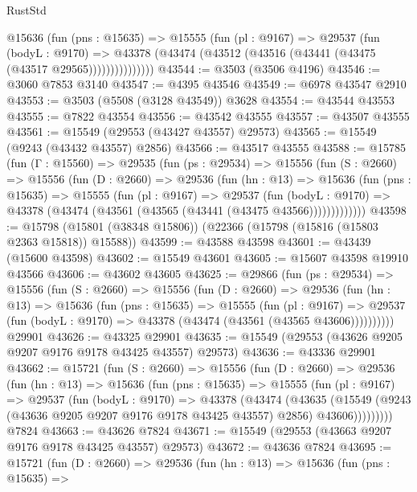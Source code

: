\begin{lexlean}{RustStd}
\begin{coremodule}
              @15636
                (fun (pns : @15635) =>
                @15555
                  (fun (pl : @9167) =>
                  @29537
                    (fun (bodyL : @9170) =>
                    @43378 (@43474 (@43512 (@43516 (@43441 (@43475 (@43517 @29565)))))))))))))))
@43544 := @3503 (@3506 @4196)
@43546 := @3060 @7853 @3140
@43547 := @4395 @43546
@43549 := @6978 @43547 @2910
@43553 := @3503 (@5508 (@3128 @43549)) @3628
@43554 := @43544 @43553
@43555 := @7822 @43554
@43556 := @43542 @43555
@43557 := @43507 @43555
@43561 := @15549 (@29553 (@43427 @43557) @29573)
@43565 := @15549 (@9243 (@43432 @43557) @2856)
@43566 := @43517 @43555
@43588 := @15785
    (fun (Γ : @15560) =>
    @29535
      (fun (ps : @29534) =>
      @15556
        (fun (S : @2660) =>
        @15556
          (fun (D : @2660) =>
          @29536
            (fun (hn : @13) =>
            @15636
              (fun (pns : @15635) =>
              @15555
                (fun (pl : @9167) =>
                @29537
                  (fun (bodyL : @9170) =>
                  @43378 (@43474 (@43561 (@43565 (@43441 (@43475 @43566)))))))))))))
@43598 := @15798 (@15801 (@38348 @15806)) (@22366 (@15798 (@15816 (@15803 @2363 @15818)) @15588))
@43599 := @43588 @43598
@43601 := @43439 (@15600 @43598)
@43602 := @15549 @43601
@43605 := @15607 @43598 @19910 @43566
@43606 := @43602 @43605
@43625 := @29866
    (fun (ps : @29534) =>
    @15556
      (fun (S : @2660) =>
      @15556
        (fun (D : @2660) =>
        @29536
          (fun (hn : @13) =>
          @15636
            (fun (pns : @15635) =>
            @15555
              (fun (pl : @9167) =>
              @29537 (fun (bodyL : @9170) => @43378 (@43474 (@43561 (@43565 @43606))))))))))
    @29901
@43626 := @43325 @29901
@43635 := @15549 (@29553 (@43626 @9205 @9207 @9176 @9178 @43425 @43557) @29573)
@43636 := @43336 @29901
@43662 := @15721
    (fun (S : @2660) =>
    @15556
      (fun (D : @2660) =>
      @29536
        (fun (hn : @13) =>
        @15636
          (fun (pns : @15635) =>
          @15555
            (fun (pl : @9167) =>
            @29537
              (fun (bodyL : @9170) =>
              @43378
                (@43474
                  (@43635
                    (@15549
                      (@9243 (@43636 @9205 @9207 @9176 @9178 @43425 @43557) @2856)
                      @43606)))))))))
    @7824
@43663 := @43626 @7824
@43671 := @15549 (@29553 (@43663 @9207 @9176 @9178 @43425 @43557) @29573)
@43672 := @43636 @7824
@43695 := @15721
    (fun (D : @2660) =>
    @29536
      (fun (hn : @13) =>
      @15636
        (fun (pns : @15635) =>

\end{coremodule}
\end{lexlean}
